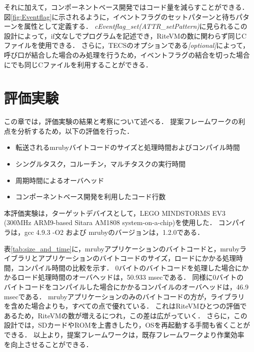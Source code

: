 \documentclass[submit,techrep]{ipsj}
\begin{document}
それに加えて，コンポーネントベース開発ではコード量を減らすことができる．
図\ref{fig:Eventflag}に示されるように，イベントフラグのセットパターンと待ちパターンを属性として定義する．
{\it cEventflag\_set(ATTR\_setPattern)}に見られるこの設計によって，if文なしでプログラムを記述でき，RiteVMの数に関わらず同じCファイルを使用できる．
さらに，TECSのオプションである{\it [optional]}によって，呼び口が結合した場合のみ処理を行うため，イベントフラグの結合を切った場合にでも同じCファイルを利用することができる．

\section{評価実験}
\vspace{-2mm}
\label{sec:Evaluation}
この章では，評価実験の結果と考察について述べる．
提案フレームワークの利点を分析するため，以下の評価を行った．
\begin{itemize}
    \item 転送されるmrubyバイトコードのサイズと処理時間およびコンパイル時間
    \item シングルタスク，コルーチン，マルチタスクの実行時間
    \item 周期時間によるオーバヘッド
    \item コンポーネントベース開発を利用したコード行数
\end{itemize}

本評価実験は，ターゲットデバイスとして，LEGO MINDSTORMS EV3 (300MHz ARM9-based Sitara AM1808 system-on-a-chip)を使用した．
コンパイラは，gcc 4.9.3 -O2 および mrubyのバージョンは，1.2.0である．

表\ref{tab:size_and_time}に，mrubyアプリケーションのバイトコードと，mrubyライブラリとアプリケーションのバイトコードのサイズ，ロードにかかる処理時間，コンパイル時間の比較を示す．
0バイトのバイトコードを処理した場合にかかるロード処理時間のオーバヘッドは，50.933 msecである．
同様に0バイトのバイトコードをコンパイルした場合にかかるコンパイルのオーバヘッドは，46.9 msecである．
mrubyアプリケーションのみのバイトコードの方が，ライブラリを含めた場合よりも，すべての点で優れている．
これはRiteVMひとつの評価であるため，RiteVMの数が増えるにつれ，この差は広がっていく．
さらに，この設計では，SDカードやROMを上書きしたり，OSを再起動する手間も省くことができる．
以上より，提案フレームワークは，既存フレームワークより作業効率を向上させることができる．
\end{document}
